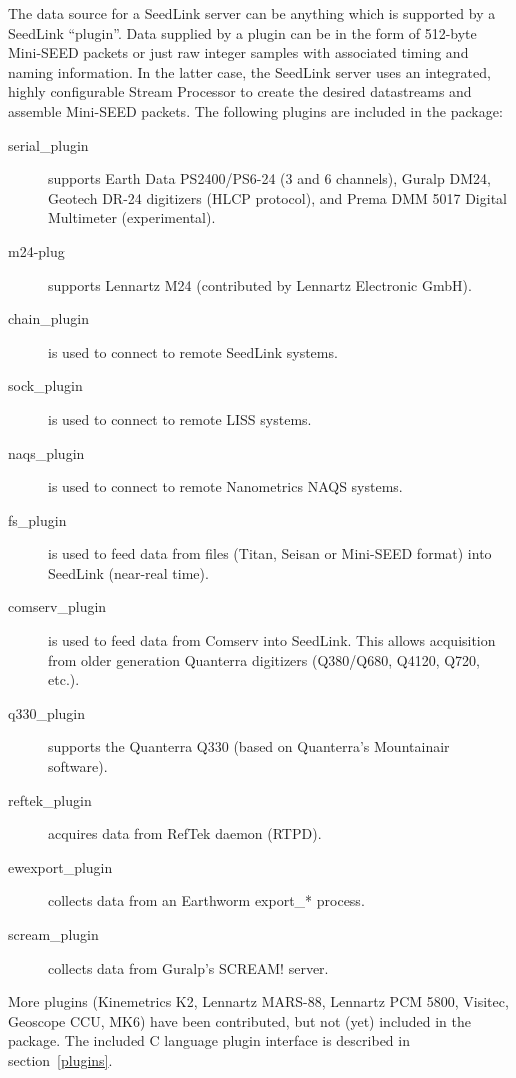 \documentclass[11pt,a4paper,titlepage]{article}
\begin{document}
The data source for a SeedLink server can be anything which is
supported by a SeedLink ``plugin''. Data supplied by a plugin can be
in the form of 512-byte Mini-SEED packets or just raw integer samples
with associated timing and naming information. In the latter case, the
SeedLink server uses an integrated, highly configurable Stream
Processor to create the desired datastreams and assemble Mini-SEED
packets. The following plugins are included in the package:
\begin{description}
\item[serial\_plugin] supports Earth Data PS2400/PS6-24 (3 and 6 channels),
Guralp DM24, Geotech DR-24 digitizers (HLCP protocol), and Prema DMM
5017 Digital Multimeter (experimental).

\item[m24-plug] supports Lennartz M24 (contributed by Lennartz
Electronic GmbH).

\item[chain\_plugin] is used to connect to remote SeedLink systems.

\item[sock\_plugin] is used to connect to remote LISS systems.

\item[naqs\_plugin] is used to connect to remote Nanometrics NAQS
systems.

\item[fs\_plugin] is used to feed data from files (Titan, Seisan or
Mini-SEED format) into SeedLink (near-real time).

\item[comserv\_plugin] is used to feed data from Comserv into
SeedLink. This allows acquisition from older generation Quanterra
digitizers (Q380/Q680, Q4120, Q720, etc.).

\item[q330\_plugin] supports the Quanterra Q330 (based on Quanterra's
Mountainair software).

\item[reftek\_plugin] acquires data from RefTek daemon (RTPD).

\item[ewexport\_plugin] collects data from an Earthworm export\_* process.

\item[scream\_plugin] collects data from Guralp's SCREAM! server.
\end{description}

More plugins (Kinemetrics K2, Lennartz MARS-88, Lennartz PCM 5800, Visitec,
Geoscope CCU, MK6) have been contributed, but not (yet) included in the
package. The included C language plugin interface is described in
section~\ref{plugins}.
\end{document}
